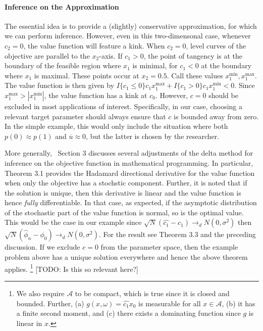 \documentclass[12pt,a4paper,english]{article} %
\numberwithin{equation}{section}
\theoremstyle{definition}
\theoremstyle{remark}
\theoremstyle{plain}
\begin{document}
\paragraph{Inference on the Approximation}
The essential idea is to provide a (slightly) conservative approximation, for which we can perform inference.
However, even in this two-dimensonal case, whenever $c_2=0$, the value function will feature a kink.
When $c_2=0$, level curves of the objective are parallel to the $x_2$-axis.
If $c_1 > 0$, the point of tangency is at the boundary of the feasible region where $x_1$ is minimal, for $c_1 < 0$ at the boundary where $x_1$ is maximal.
These points occur at $x_2=0.5$.
Call these values $x_1^{\min}, x_1^{\max}$.
The value function is then given by $I\{c_1 \leq 0\} c_1 x_1^{\max} + I\{c_1 > 0\} c_1 x_1^{\min} < 0$.
Since $x_1^{\max} > |x_1^{\min}|$, the value function has a kink at $c_0$.
However, $c = 0$ should be excluded in most applications of interest.
Specifically, in our case, choosing a relevant target parameter should always ensure that $c$ is bounded away from zero.
In the simple example, this would only include the situation where both $p(0) \approx p(1)$ and $\overline{u} \approx 0$, but the latter is chosen by the researcher.

More generally,~\cite{shapiro1991asymptotic} Section 3 discusses several adjustments of the delta method for inference on the objective function in mathematical programming.
In particular, Theorem 3.1 provides the Hadamard directional derivative for the value function when only the objective has a stochstic component.
Further, it is noted that if the solution is unique, then this derivative is linear and the value function is hence \textit{fully} differentiable.
In that case, as expected, if the asymptotic distribution of the stochastic part of the value function is normal, so is the optimal value.
This would be the case in our example since $\sqrt{N}(\hat{c_1} - c_1) \to_d N(0,\sigma^2)$ then $\sqrt{N}(\hat{\phi}_n - \phi_0) \to_d N(0,\sigma^2)$.
For the result see Theorem 3.3 and the preceding discussion.
If we exclude $c=0$ from the parameter space, then the example problem above has a unique solution everywhere and hence the above theorem applies.
\footnote{We also require $\mathcal{A}$ to be compact, which is true since it is closed and bounded.
Further, (a) $g(x, \omega) = \hat{c_1}x_0$ is measurable for all $x \in \mathcal{A}$, (b) it has a finite second moment, and (c) there exists a dominating function since $g$ is linear in $x$.}
[TODO: Is this so relevant here?]
\end{document}
